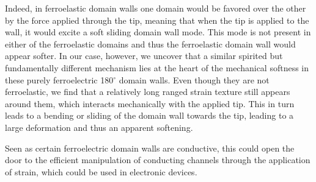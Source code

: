 Indeed, in ferroelastic domain walls one domain would be favored over the other by the force applied through the tip, meaning that when the tip is applied to the wall, it would excite a soft sliding domain wall mode.
This mode is not present in either of the ferroelastic domains and thus the ferroelastic domain wall would appear softer.
In our case, however, we uncover that a similar spirited but fundamentally different mechanism lies at the heart of the mechanical softness in these purely ferroelectric 180$^\circ$ domain walls.
Even though they are not ferroelastic, we find that a relatively long ranged strain texture still appears around them, which interacts mechanically with the applied tip.
This in turn leads to a bending or sliding of the domain wall towards the tip, leading to a large deformation and thus an apparent softening.

Seen as certain ferroelectric domain walls are conductive, this could open the door to the efficient manipulation of conducting channels through the application of strain, which could be used in electronic devices.
